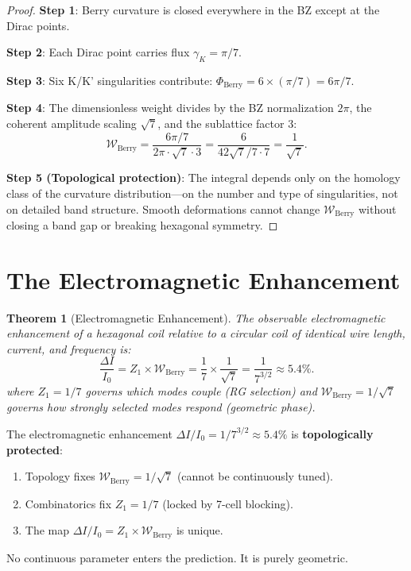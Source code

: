 \documentclass[11pt,letterpaper]{article}
\newtheorem{theorem}{Theorem}[section]
\begin{document}
\begin{proof}
\textbf{Step 1}: Berry curvature is closed everywhere in the BZ
except at the Dirac points.

\textbf{Step 2}: Each Dirac point carries flux $\gamma_K = \pi/7$.

\textbf{Step 3}: Six K/K' singularities contribute:
$\Phi_\mathrm{Berry} = 6\times(\pi/7) = 6\pi/7$.

\textbf{Step 4}: The dimensionless weight divides by the BZ normalization
$2\pi$, the coherent amplitude scaling $\sqrt{7}$, and the sublattice
factor 3:
\begin{equation}
  \mathcal{W}_\mathrm{Berry}
  = \frac{6\pi/7}{2\pi\cdot\sqrt{7}\cdot3}
  = \frac{6}{42\sqrt{7}/7\cdot 7}
  = \frac{1}{\sqrt{7}}.
\end{equation}

\textbf{Step 5 (Topological protection)}: The integral depends only on
the homology class of the curvature distribution---on the number and type
of singularities, not on detailed band structure.  Smooth deformations
cannot change $\mathcal{W}_\mathrm{Berry}$ without closing a band gap
or breaking hexagonal symmetry.
\end{proof}

\section{The Electromagnetic Enhancement}\label{sec:em}

\begin{theorem}[Electromagnetic Enhancement]\label{thm:em}
The observable electromagnetic enhancement of a hexagonal coil relative
to a circular coil of identical wire length, current, and frequency is:
\begin{equation}
  \boxed{\frac{\Delta I}{I_0}
  = Z_1 \times \mathcal{W}_\mathrm{Berry}
  = \frac{1}{7}\times\frac{1}{\sqrt{7}}
  = \frac{1}{7^{3/2}}
  \approx 5.4\%.}
\end{equation}
where $Z_1 = 1/7$ governs \emph{which modes couple} (RG selection) and
$\mathcal{W}_\mathrm{Berry} = 1/\sqrt{7}$ governs \emph{how strongly
selected modes respond} (geometric phase).
\end{theorem}

\begin{tcolorbox}[colback=hlrtred!5!white,colframe=hlrtred,title=Topological Lock]
The electromagnetic enhancement $\Delta I/I_0 = 1/7^{3/2}\approx5.4\%$
is \textbf{topologically protected}:
\begin{enumerate}[nosep]
  \item Topology fixes $\mathcal{W}_\mathrm{Berry} = 1/\sqrt{7}$
        (cannot be continuously tuned).
  \item Combinatorics fix $Z_1 = 1/7$ (locked by 7-cell blocking).
  \item The map $\Delta I/I_0 = Z_1\times\mathcal{W}_\mathrm{Berry}$ is unique.
\end{enumerate}
No continuous parameter enters the prediction.  It is purely geometric.
\end{tcolorbox}
\end{document}
